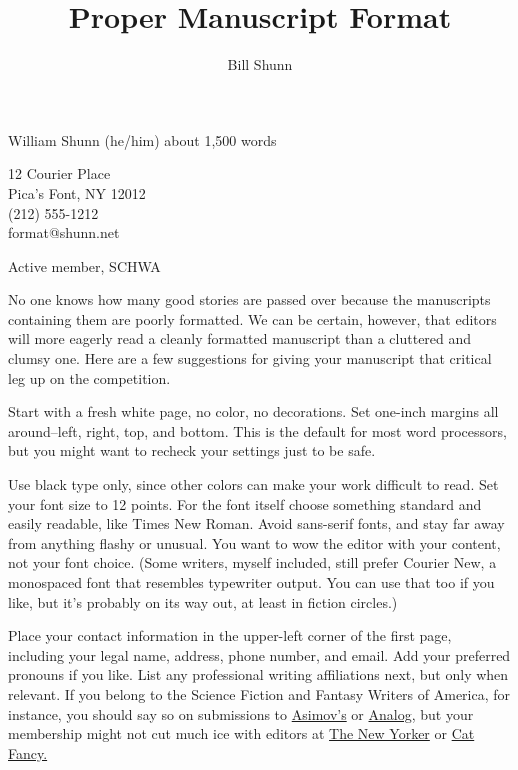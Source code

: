 \documentclass[12pt]{article}
\title{Proper Manuscript Format}
\author{Bill Shunn}
\begin{document}
\raggedright William Shunn (he/him) 
\hfill
\raggedleft about 1,500 words

\raggedright 12 Courier Place \\
Pica’s Font, NY 12012 \\
(212) 555-1212 \\
format@shunn.net\\

\linespread{2}\selectfont

Active member, SCHWA

\setlength\parindent{0.5in}
\setlength{\parskip}{0pt}

\let\originalnewpage\newpage
\let\newpage\relax
\maketitle
\let\newpage\originalnewpage

\thispagestyle{empty}

No one knows how many good stories are passed over because
the manuscripts containing them are poorly formatted. We can be
certain, however, that editors will more eagerly read a cleanly
formatted manuscript than a cluttered and clumsy one. Here are a
few suggestions for giving your manuscript that critical leg up
on the competition.

Start with a fresh white page, no color, no decorations.
Set one-inch margins all around--left, right, top, and bottom.
This is the default for most word processors, but you might want
to recheck your settings just to be safe.

Use black type only, since other colors can make your work
difficult to read. Set your font size to 12 points. For the font itself choose something standard and easily readable, like Times New Roman. Avoid sans-serif fonts, and stay far away from
anything flashy or unusual. You want to wow the editor with your
content, not your font choice. (Some writers, myself included,
still prefer Courier New, a monospaced font that resembles
typewriter output. You can use that too if you like, but it’s
probably on its way out, at least in fiction circles.)

Place your contact information in the upper-left corner of
the first page, including your legal name, address, phone number,
and email. Add your preferred pronouns if you like. List any
professional writing affiliations next, but only when relevant.
If you belong to the Science Fiction and Fantasy Writers of
America, for instance, you should say so on submissions to
\underline{Asimov’s} or \underline{Analog,} but your membership might not cut much ice
with editors at \underline{The New Yorker} or \underline{Cat Fancy.}
\end{document}
